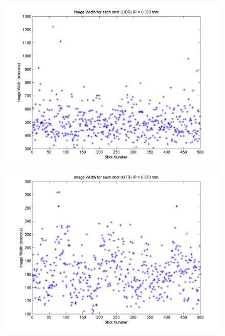\documentclass[12pt]{article}
\begin{document}
\begin{figure}
\begin{center}
\includegraphics[scale=0.5]{Figures/ImageWidth_ODR_370.PNG}
\includegraphics[scale=0.5]{Figures/ImageWidth_OTR_370.PNG}
\caption{}
\end{center}
\end{figure}
\end{document}
